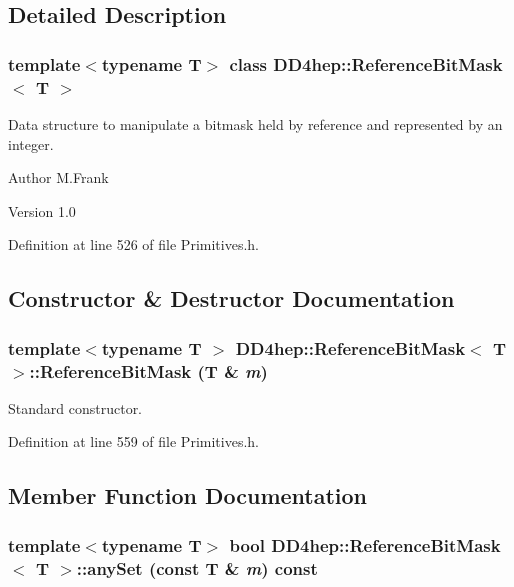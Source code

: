 \subsection{Detailed Description}
\subsubsection*{template$<$typename T$>$ class DD4hep::ReferenceBitMask$<$ T $>$}

Data structure to manipulate a bitmask held by reference and represented by an integer. \begin{DoxyAuthor}{Author}
M.Frank 
\end{DoxyAuthor}
\begin{DoxyVersion}{Version}
1.0 
\end{DoxyVersion}


Definition at line 526 of file Primitives.h.

\subsection{Constructor \& Destructor Documentation}
\hypertarget{class_d_d4hep_1_1_reference_bit_mask_abd3539ce53a7879da72da52fadb2b829}{
\subsubsection[{ReferenceBitMask}]{\setlength{\rightskip}{0pt plus 5cm}template$<$typename T $>$ {\bf DD4hep::ReferenceBitMask}$<$ T $>$::{\bf ReferenceBitMask} (T \& {\em m})}}
\label{class_d_d4hep_1_1_reference_bit_mask_abd3539ce53a7879da72da52fadb2b829}


Standard constructor. 

Definition at line 559 of file Primitives.h.

\subsection{Member Function Documentation}
\hypertarget{class_d_d4hep_1_1_reference_bit_mask_a34cd8c04a587c137d339a6eb4469cd0b}{
\subsubsection[{anySet}]{\setlength{\rightskip}{0pt plus 5cm}template$<$typename T$>$ bool {\bf DD4hep::ReferenceBitMask}$<$ T $>$::anySet (const T \& {\em m}) const}}
\label{class_d_d4hep_1_1_reference_bit_mask_a34cd8c04a587c137d339a6eb4469cd0b}


